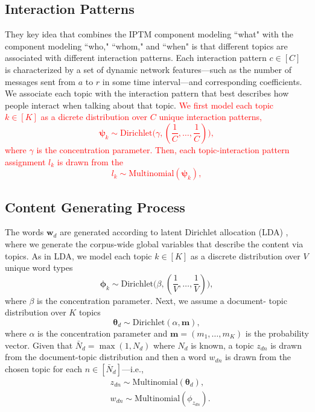 \documentclass{article}
\begin{document}
\subsection{Interaction Patterns}\label{subsec:Interaction patterns}
They key idea that combines the IPTM component modeling ``what" with
the component modeling ``who," ``whom," and ``when" is that different
topics are associated with different interaction patterns.  Each interaction pattern $c \in [C]$ is characterized by a set of dynamic network features---such as the number of messages sent from $a$ to $r$ in some time interval---and corresponding coefficients. We associate each topic with the interaction pattern that best describes how people interact when talking about that topic. 
\textcolor{red}{
We first model each topic $k \in [K]$ as a dicrete distribution over $C$ unique interaction patterns,
\begin{equation}
	\boldsymbol{\psi}_k\sim \mbox{Dirichlet}\Big(\gamma, (\frac{1}{C},\ldots,\frac{1}{C})\Big),
\end{equation}
where $\gamma$ is the concentration parameter. Then, each topic-interaction pattern assignment $l_k$ is drawn from the 
\begin{equation}
l_k\sim \mbox{Multinomial}(\boldsymbol{\psi}_k),
\end{equation}
}
\subsection{Content Generating Process}\label{subsec:Content generating process}

The words $\boldsymbol{w}_d$ are generated according to latent Dirichlet allocation (LDA) \cite{Blei2003}, where we generate the corpus-wide global variables that describe the content via topics. As in LDA, we model each topic $k\in [K]$ as a discrete distribution over $V$ unique word types 
\begin{equation}
\boldsymbol{\phi}_k \sim \mbox{Dirichlet}\Big(\beta, (\frac{1}{V},\ldots,\frac{1}{V})\Big),
\end{equation}
where $\beta$ is the concentration parameter. Next, we assume a document- topic distribution over $K$ topics\\
\begin{equation}
\boldsymbol{\theta}_d \sim \mbox{Dirichlet}(\alpha, \boldsymbol{m}),
\end{equation}
where $\alpha$ is the concentration parameter and $\boldsymbol{m}=(m_1,\ldots,m_K)$ is the probability vector. Given that $\bar N_d = \max(1, N_d)$ where $N_d$ is known, a topic $z_{dn}$ is drawn from the document-topic distribution and then a word $w_{dn}$ is drawn from the chosen topic for each $n \in [\bar N_d]$---i.e.,
\begin{equation}
\begin{aligned}
&z_{dn} \sim \mbox{Multinomial}(\boldsymbol{\theta}_d),\\
&w_{dn} \sim\mbox{Multinomial} (\phi_{z_{dn}}).
\end{aligned}
\end{equation}
\end{document}
